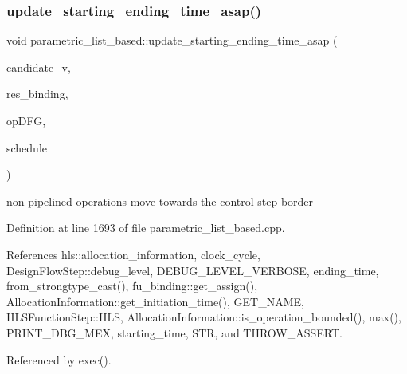 \subsubsection{\texorpdfstring{update\+\_\+starting\+\_\+ending\+\_\+time\+\_\+asap()}{update\_starting\_ending\_time\_asap()}}
{\footnotesize\ttfamily void parametric\+\_\+list\+\_\+based\+::update\+\_\+starting\+\_\+ending\+\_\+time\+\_\+asap (\begin{DoxyParamCaption}\item[{\hyperlink{graph_8hpp_abefdcf0544e601805af44eca032cca14}{vertex}}]{candidate\+\_\+v,  }\item[{\hyperlink{fu__binding_8hpp_a619181df8ab98d7b7e17de58ac44b065}{fu\+\_\+binding\+Ref}}]{res\+\_\+binding,  }\item[{\hyperlink{op__graph_8hpp_a9a0b240622c47584bee6951a6f5de746}{Op\+Graph\+Const\+Ref}}]{op\+D\+FG,  }\item[{const \hyperlink{schedule_8hpp_a85e4dea8a1611026193d8ca13fc5a260}{Schedule\+Const\+Ref}}]{schedule }\end{DoxyParamCaption})\hspace{0.3cm}{\ttfamily [private]}}

non-\/pipelined operations move towards the control step border 

Definition at line 1693 of file parametric\+\_\+list\+\_\+based.\+cpp.



References hls\+::allocation\+\_\+information, clock\+\_\+cycle, Design\+Flow\+Step\+::debug\+\_\+level, D\+E\+B\+U\+G\+\_\+\+L\+E\+V\+E\+L\+\_\+\+V\+E\+R\+B\+O\+SE, ending\+\_\+time, from\+\_\+strongtype\+\_\+cast(), fu\+\_\+binding\+::get\+\_\+assign(), Allocation\+Information\+::get\+\_\+initiation\+\_\+time(), G\+E\+T\+\_\+\+N\+A\+ME, H\+L\+S\+Function\+Step\+::\+H\+LS, Allocation\+Information\+::is\+\_\+operation\+\_\+bounded(), max(), P\+R\+I\+N\+T\+\_\+\+D\+B\+G\+\_\+\+M\+EX, starting\+\_\+time, S\+TR, and T\+H\+R\+O\+W\+\_\+\+A\+S\+S\+E\+RT.



Referenced by exec().

